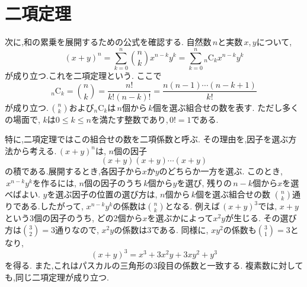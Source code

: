 
  \section{二項定理}\label{節：二項定理}
    次に,和の累乗を展開するための公式を確認する.
    自然数$\,n$と実数$\,x,y$について,
    \[
      (x+y)^n=\sum_{k=0}^{n}\binom{n}{k}x^{n-k}y^{k}=\sum_{k=0}^{n}{}_n\mathrm{C}_kx^{n-k}y^{k}
    \]
    が成り立つ.これを二項定理という.
    ここで
    \[
      {}_n\mathrm{C}_k=\binom{n}{k}
      =\frac{n!}{k!(n-k)!}
      =\frac{n(n-1)\cdots(n-k+1)}{k!}
    \]
    が成り立つ.\,$\binom{n}{k}$および${}_n\mathrm{C}_k$は$\,n$個から$\,k$個を選ぶ組合せの数を表す.
    ただし多くの場面で,\,$\,k$は$0\le k\le n$を満たす整数であり,\,$0!=1$である.
    
    特に,二項定理ではこの組合せの数を二項係数と呼ぶ.
    その理由を,因子を選ぶ方法から考える.\,$(x+y)^n$は,\,$\,n$個の因子
    \[
      (x+y)(x+y)\cdots(x+y)
    \]
    の積である.展開するとき,各因子から$x$か$y$のどちらか一方を選ぶ.
    このとき,\,$\,x^{n-k}y^k$を作るには,\,$\,n$個の因子のうち$\,k$個から$y$を選び,
    残りの$\,n-k$個から$x$を選べばよい.
    $y$を選ぶ因子の位置の選び方は,\,$\,n$個から$\,k$個を選ぶ組合せの数
    $\binom{n}{k}$通りである.したがって,\,$\,x^{n-k}y^k$の係数は$\binom{n}{k}$となる.
    例えば$\,(x+y)^3$では,\,$\,x+y$という3個の因子のうち,
    どの2個から$x$を選ぶかによって$x^2y$が生じる.
    その選び方は$\binom{3}{2}=3$通りなので,\,$\,x^2y$の係数は$3$である.
    同様に,\,$\,xy^2$の係数も$\binom{3}{1}=3$となり,
    \[
      (x+y)^3=x^3+3x^2y+3xy^2+y^3
    \]
    を得る.
    また,これはパスカルの三角形の3段目の係数と一致する.
    複素数に対しても,同じ二項定理が成り立つ.